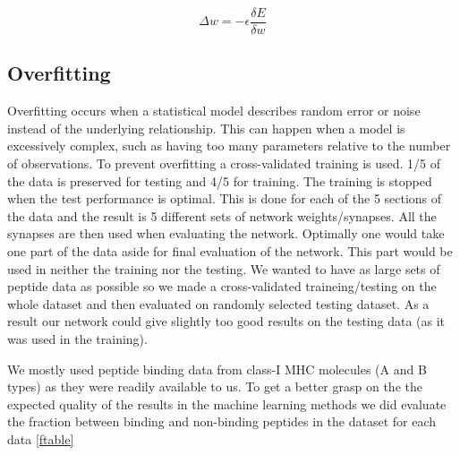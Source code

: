 \begin{equation}
\Delta w = -\epsilon \frac{\delta E}{\delta w}
\end{equation}

\subsection*{Overfitting}
Overfitting occurs when a statistical model describes random error or noise instead of the underlying relationship.
This can happen when a model is excessively complex, such as having too many parameters relative to the number of observations.
To prevent overfitting a cross-validated training is used. 1/5 of the data is preserved for testing and 4/5 for training. 
The training is stopped when the test performance is optimal. This is done for each of the 5 sections of the data and the result is 5 different sets of network weights/synapses.
All the synapses are then used when evaluating the network.
Optimally one would take one part of the data aside for final evaluation of the network. This part would be used in neither the training nor the testing.
We wanted to have as large sets of peptide data as possible so we made a cross-validated traineing/testing on the whole dataset and then evaluated on randomly selected testing dataset.
As a result our network could give slightly too good results on the testing data (as it was used in the training).

We mostly used peptide binding data from class-I MHC molecules (A and B types) as they were readily available to us.
To get a better grasp on the the expected quality of the results in the machine learning methods we did evaluate the fraction between binding and non-binding peptides in the dataset for each data {\ref{ftable}}

